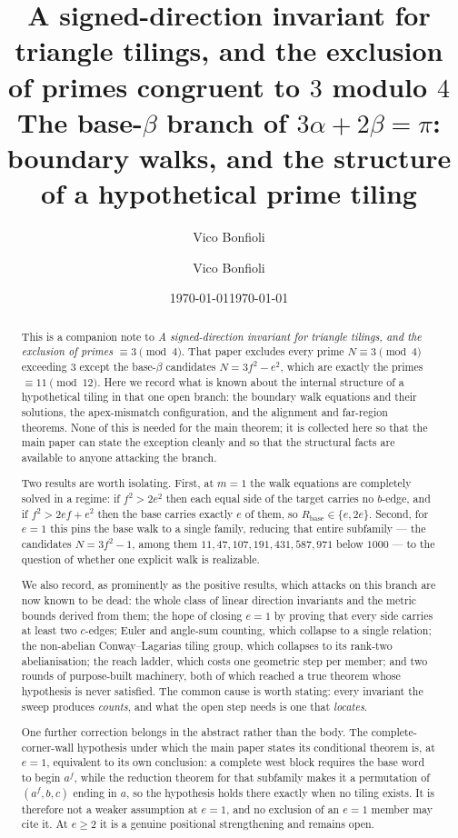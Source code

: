 \documentclass[11pt,reqno]{amsart}
\title[A signed-direction invariant for triangle tilings]{A signed-direction invariant for triangle tilings, and the exclusion of primes congruent to $3$ modulo $4$}
\author{Vico Bonfioli}
\date{\today}
\theoremstyle{plain}
\theoremstyle{definition}
\begin{document}
\title{The base-$\beta$ branch of $3\alpha+2\beta=\pi$: boundary walks, and the structure of a
hypothetical prime tiling}

\author{Vico Bonfioli}

\date{\today}

\begin{abstract}
This is a companion note to \emph{A signed-direction invariant for triangle tilings, and the
exclusion of primes $\equiv3\pmod4$}. That paper excludes every prime $N\equiv3\pmod4$ exceeding
$3$ except the base-$\beta$ candidates $N=3f^2-e^2$, which are exactly the primes
$\equiv11\pmod{12}$. Here we record what is known about the internal structure of a hypothetical
tiling in that one open branch: the boundary walk equations and their solutions, the apex-mismatch
configuration, and the alignment and far-region theorems. None of this is needed for the main
theorem; it is collected here so that the main paper can state the exception cleanly and so that
the structural facts are available to anyone attacking the branch.

Two results are worth isolating. First, at $m=1$ the walk equations are completely solved in a
regime: if $f^2>2e^2$ then each equal side of the target carries no $b$-edge, and if
$f^2>2ef+e^2$ then the base carries exactly $e$ of them, so $R_{\mathrm{base}}\in\{e,2e\}$. Second,
for $e=1$ this pins the base walk to a single family, reducing that entire subfamily --- the
candidates $N=3f^2-1$, among them $11,47,107,191,431,587,971$ below $1000$ --- to the question of
whether one explicit walk is realizable.

We also record, as prominently as the positive results, which attacks on this branch are now known
to be dead: the whole class of linear direction invariants and the metric bounds derived from them;
the hope of closing $e=1$ by proving that every side carries at least two $c$-edges; Euler and
angle-sum counting, which collapse to a single relation; the non-abelian Conway--Lagarias tiling
group, which collapses to its rank-two abelianisation; the reach ladder, which costs one geometric
step per member; and two rounds of purpose-built machinery, both of which reached a true theorem
whose hypothesis is never satisfied. The common cause is worth stating: every invariant the sweep
produces \emph{counts}, and what the open step needs is one that \emph{locates}.

One further correction belongs in the abstract rather than the body. The complete-corner-wall
hypothesis under which the main paper states its conditional theorem is, at $e=1$, equivalent to its
own conclusion: a complete west block requires the base word to begin $a^f$, while the reduction
theorem for that subfamily makes it a permutation of $(a^f,b,c)$ ending in $a$, so the hypothesis
holds there exactly when no tiling exists. It is therefore not a weaker assumption at $e=1$, and no
exclusion of an $e=1$ member may cite it. At $e\ge2$ it is a genuine positional strengthening and
remains open.
\end{abstract}
\end{document}
